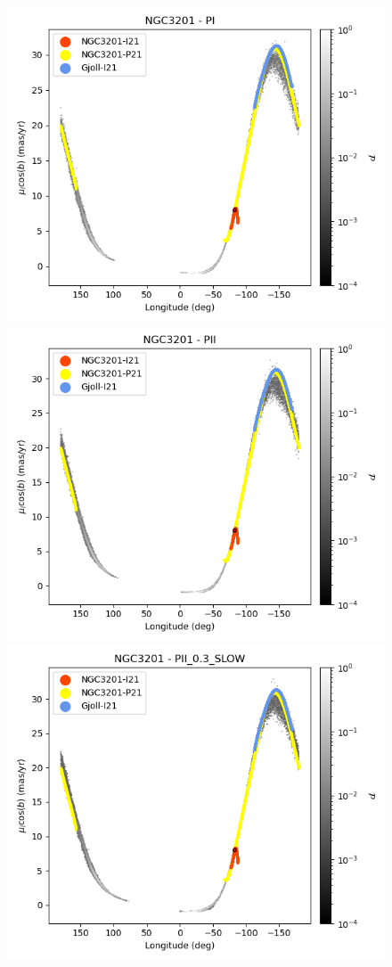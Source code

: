 \begin{figure}[h!]
\begin{center}
                    \includegraphics[clip=true, trim = 0mm 0mm 0mm 0mm, width=0.65\columnwidth]{images/PI_individual_NGC3201_galstream-NGC3201-l-pm_l_cosb.png}
                    \includegraphics[clip=true, trim = 0mm 0mm 0mm 0mm, width=0.65\columnwidth]{images/PII_individual_NGC3201_galstream-NGC3201-l-pm_l_cosb.png}
                    \includegraphics[clip=true, trim = 0mm 0mm 0mm 0mm, width=0.65\columnwidth]{images/PII_0.3_SLOW_individual_NGC3201_galstream-NGC3201-l-pm_l_cosb.png}
                        

\end{center}
\end{figure}
